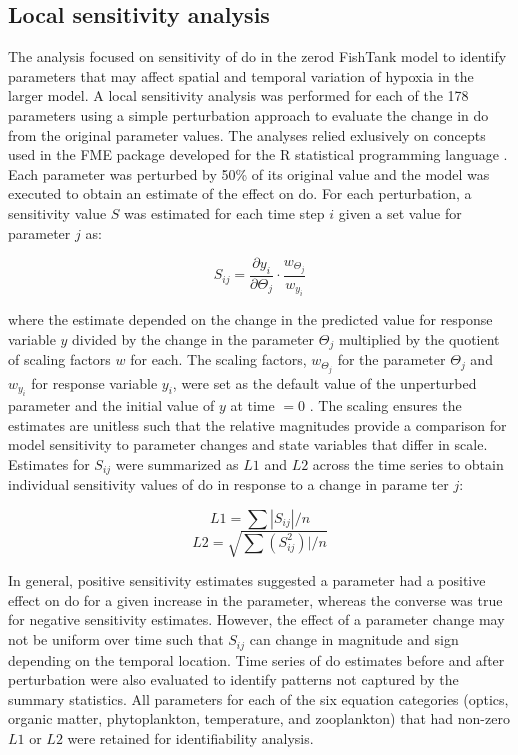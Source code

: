 \documentclass[letterpaper,12pt,oneside]{article}\usepackage[]{graphicx}\usepackage[]{color}
\begin{document}
\subsection{Local sensitivity analysis}

The analysis focused on sensitivity of \ac{do} in the \ac{zerod} FishTank model to identify parameters that may affect spatial and temporal variation of hypoxia in the larger model.  A local sensitivity analysis was performed for each of the 178 parameters using a simple perturbation approach to evaluate the change in \ac{do} from the original parameter values.  The analyses relied exlusively on concepts used in the FME package developed for the R statistical programming language \citep{Soetaert10}. Each parameter was perturbed by 50\% of its original value and the model was executed to obtain an estimate of the effect on \ac{do}.  For each perturbation, a sensitivity value $S$ was estimated for each time step $i$ given a set value for parameter $j$ as:

\begin{equation} \label{sijeqn}
S_{ij} = \frac{\partial y_i}{\partial \Theta_j}\cdot\frac{w_{\Theta_j}}{w_{y_i}}
\end{equation}

\noindent where the estimate depended on the change in the predicted value for response variable $y$ divided by the change in the parameter $\Theta_j$ multiplied by the quotient of scaling factors $w$ for each.  The scaling factors, $w_{\Theta_j}$ for the parameter $\Theta_j$ and $w_{y_i}$ for response variable $y_i$, were set as the default value of the unperturbed parameter and the initial value of $y$ at time $= 0$ \citep{Soetaert10}.  The scaling ensures the estimates are unitless such that the relative magnitudes provide a comparison for model sensitivity to parameter changes and state variables that differ in scale.  Estimates for $S_{ij}$ were summarized as $L1$ and $L2$ across the time series to obtain individual sensitivity values of \ac{do} in response to a change in parame ter $j$:

\begin{equation} \label{l1}
L1 = \sum|S_{ij}|/n
\end{equation}
\begin{equation} \label{l2}
L2 = \sqrt{\sum\left(S_{ij}^2\right)|/n}
\end{equation}

In general, positive sensitivity estimates suggested a parameter had a positive effect on \ac{do} for a given increase in the parameter, whereas the converse was true for negative sensitivity estimates.  However, the effect of a parameter change may not be uniform over time such that $S_{ij}$ can change in magnitude and sign depending on the temporal location.  Time series of \ac{do} estimates before and after perturbation were also evaluated to identify patterns not captured by the summary statistics. All parameters for each of the six equation categories (optics, organic matter, phytoplankton, temperature, and zooplankton) that had non-zero $L1$ or $L2$ were retained for identifiability analysis.  
\end{document}
